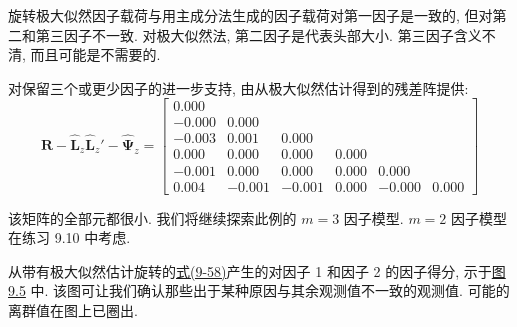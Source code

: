 旋转极大似然因子载荷与用主成分法生成的因子载荷对第一因子是一致的, 但对第二和第三因子不一致. 对极大似然法, 第二因子是代表头部大小. 第三因子含义不清, 而且可能是不需要的.

对保留三个或更少因子的进一步支持, 由从极大似然估计得到的残差阵提供:
\[
\mathbf{R}-\hat{\mathbf{L}}_z\hat{\mathbf{L}}_z'-\hat{\boldsymbol{\Psi}}_z=
\left[\begin{array}{rrrrrr}
0.000& & & & & \\
-0.000&0.000& & & & \\
-0.003&0.001&0.000& & & \\
0.000&0.000&0.000&0.000& & \\
-0.001&0.000&0.000&0.000&0.000& \\
0.004&-0.001&-0.001&0.000&-0.000&0.000
\end{array}\right]
\]

该矩阵的全部元都很小. 我们将继续探索此例的 $m=3$ 因子模型. $m=2$ 因子模型在练习 9.10 中考虑.

从带有极大似然估计旋转的\hyperref[eq:9-58]{式(9-58)}产生的对因子 1 和因子 2 的因子得分, 示于\hyperref[fig:9.5]{图 9.5} 中. 该图可让我们确认那些出于某种原因与其余观测值不一致的观测值. 可能的离群值在图上已圈出.
